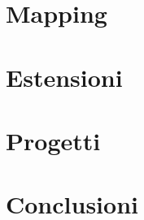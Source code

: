\documentclass[12pt,a4paper,openright,twoside]{book}
\begin{document}
\chapter{Mapping} %
\label{chap:mapping}

\chapter{Estensioni} %
\label{chap:extensions}

\chapter{Progetti} %
\label{chap:projects}

\chapter{Conclusioni}
\label{chap:conclusions}





\end{document}
